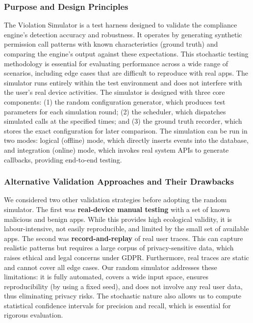 \subsubsection{Purpose and Design Principles}

The Violation Simulator is a test harness designed to validate the compliance engine's detection accuracy and robustness. It operates by generating synthetic permission call patterns with known characteristics (ground truth) and comparing the engine's output against these expectations. This stochastic testing methodology is essential for evaluating performance across a wide range of scenarios, including edge cases that are difficult to reproduce with real apps. The simulator runs entirely within the test environment and does not interfere with the user's real device activities. The simulator is designed with three core components: (1) the random configuration generator, which produces test parameters for each simulation round; (2) the scheduler, which dispatches simulated calls at the specified times; and (3) the ground truth recorder, which stores the exact configuration for later comparison. The simulation can be run in two modes: logical (offline) mode, which directly inserts events into the database, and integration (online) mode, which invokes real system APIs to generate callbacks, providing end-to-end testing.

\subsubsection{Alternative Validation Approaches and Their Drawbacks}

We considered two other validation strategies before adopting the random simulator. The first was \textbf{real-device manual testing} with a set of known malicious and benign apps. While this provides high ecological validity, it is labour-intensive, not easily reproducible, and limited by the small set of available apps. The second was \textbf{record-and-replay} of real user traces. This can capture realistic patterns but requires a large corpus of privacy-sensitive data, which raises ethical and legal concerns under GDPR. Furthermore, real traces are static and cannot cover all edge cases. Our random simulator addresses these limitations: it is fully automated, covers a wide input space, ensures reproducibility (by using a fixed seed), and does not involve any real user data, thus eliminating privacy risks. The stochastic nature also allows us to compute statistical confidence intervals for precision and recall, which is essential for rigorous evaluation.

